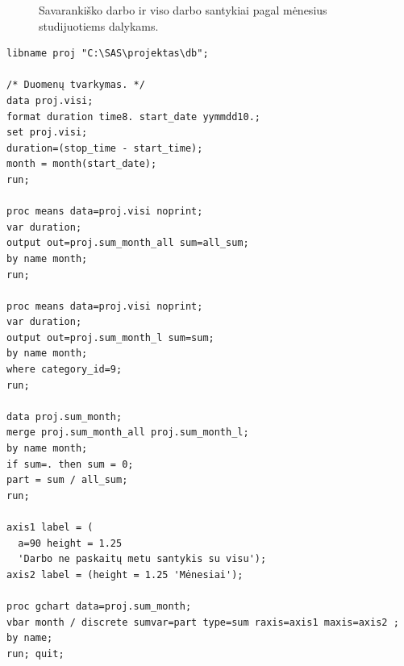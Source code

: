 \begin{figure}[H]
  \centering




  \caption{Savarankiško darbo ir viso darbo santykiai pagal mėnesius
    studijuotiems dalykams.}
  \label{fig:semester_work_part}
\end{figure}

\begin{listing}[H]
  \begin{verbatim}
libname proj "C:\SAS\projektas\db";

/* Duomenų tvarkymas. */
data proj.visi;
format duration time8. start_date yymmdd10.;
set proj.visi;
duration=(stop_time - start_time);
month = month(start_date);
run;

proc means data=proj.visi noprint;
var duration;
output out=proj.sum_month_all sum=all_sum;
by name month;
run;

proc means data=proj.visi noprint;
var duration;
output out=proj.sum_month_l sum=sum;
by name month;
where category_id=9;
run;

data proj.sum_month;
merge proj.sum_month_all proj.sum_month_l;
by name month;
if sum=. then sum = 0;
part = sum / all_sum;
run;

axis1 label = (
  a=90 height = 1.25
  'Darbo ne paskaitų metu santykis su visu');
axis2 label = (height = 1.25 'Mėnesiai');

proc gchart data=proj.sum_month;
vbar month / discrete sumvar=part type=sum raxis=axis1 maxis=axis2 ;
by name;
run; quit;
  \end{verbatim}
  \caption{SAS programa naudota santykių skaičiavimui.}
  \label{lst:months_part}
\end{listing}

